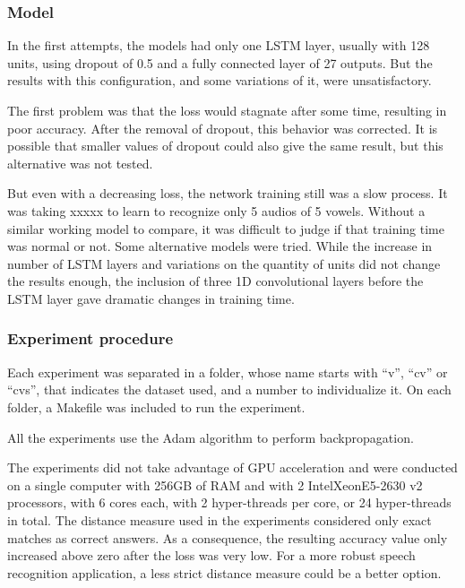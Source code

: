 \subsubsection{Model}

In the first attempts, the models had only one LSTM layer, usually with 128 units, using dropout of 0.5 and a fully connected layer of 27 outputs. But the results with this configuration, and some variations of it, were unsatisfactory.

The first problem was that the loss would stagnate after some time, resulting in poor accuracy. After the removal of dropout, this behavior was corrected. It is possible that smaller values of dropout could also give the same result, but this alternative was not tested.

But even with a decreasing loss, the network training still was a slow process. It was taking xxxxx 
to learn to recognize only 5 audios of 5 vowels.
Without a similar working model to compare, it was difficult to judge if that training time was normal or not. Some alternative models were tried. While the increase in number of LSTM layers and variations on the quantity of units did not change the results enough, the inclusion of three 1D convolutional layers before the LSTM layer gave dramatic changes in training time.

\subsubsection{Experiment procedure}
Each experiment was separated in a folder, whose name starts with ``v'', ``cv'' or ``cvs'', that indicates the dataset used, and a number to individualize it. On each folder, a Makefile was included to run the experiment.

All the experiments use the Adam
algorithm to perform backpropagation.

The experiments did not take advantage of GPU acceleration and were  conducted on a single computer with 256GB of RAM and with 2 Intel\textregistered Xeon\textregistered E5-2630 v2 processors, with 6 cores each, with 2 hyper-threads per core, or 24 hyper-threads in total. 
The distance measure used in the experiments considered only exact matches as correct answers. As a consequence, the resulting accuracy value only increased above zero after the loss was very low. For a more robust speech recognition application, a less strict distance measure could be a better option.

